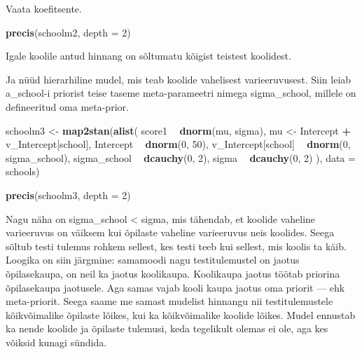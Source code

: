 \documentclass[]{book}
\newenvironment{Shaded}{\begin{snugshade}}{\end{snugshade}}
\newcommand{\KeywordTok}[1]{\textcolor[rgb]{0.13,0.29,0.53}{\textbf{#1}}}
\newcommand{\DataTypeTok}[1]{\textcolor[rgb]{0.13,0.29,0.53}{#1}}
\newcommand{\DecValTok}[1]{\textcolor[rgb]{0.00,0.00,0.81}{#1}}
\newcommand{\StringTok}[1]{\textcolor[rgb]{0.31,0.60,0.02}{#1}}
\newcommand{\OperatorTok}[1]{\textcolor[rgb]{0.81,0.36,0.00}{\textbf{#1}}}
\newcommand{\NormalTok}[1]{#1}
\begin{document}
Vaata koefitsente.

\begin{Shaded}
\begin{Highlighting}[]
\KeywordTok{precis}\NormalTok{(schoolm2, }\DataTypeTok{depth =} \DecValTok{2}\NormalTok{)}
\end{Highlighting}
\end{Shaded}

Igale koolile antud hinnang on sõltumatu kõigist teistest koolidest.

Ja nüüd hierarhiline mudel, mis teab koolide vahelisest varieeruvusest.
Siin leiab a\_school-i priorist teise taseme meta-parameetri nimega
sigma\_school, millele on defineeritud oma meta-prior.

\begin{Shaded}
\begin{Highlighting}[]
\NormalTok{schoolm3 <-}\StringTok{ }\KeywordTok{map2stan}\NormalTok{(}\KeywordTok{alist}\NormalTok{(}
\NormalTok{  score1 }\OperatorTok{~}\StringTok{ }\KeywordTok{dnorm}\NormalTok{(mu, sigma),}
\NormalTok{  mu <-}\StringTok{ }\NormalTok{Intercept }\OperatorTok{+}\StringTok{ }\NormalTok{v_Intercept[school],}
\NormalTok{  Intercept }\OperatorTok{~}\StringTok{ }\KeywordTok{dnorm}\NormalTok{(}\DecValTok{0}\NormalTok{, }\DecValTok{50}\NormalTok{),}
\NormalTok{  v_Intercept[school] }\OperatorTok{~}\StringTok{ }\KeywordTok{dnorm}\NormalTok{(}\DecValTok{0}\NormalTok{, sigma_school),}
\NormalTok{  sigma_school }\OperatorTok{~}\StringTok{ }\KeywordTok{dcauchy}\NormalTok{(}\DecValTok{0}\NormalTok{, }\DecValTok{2}\NormalTok{),}
\NormalTok{  sigma }\OperatorTok{~}\StringTok{ }\KeywordTok{dcauchy}\NormalTok{(}\DecValTok{0}\NormalTok{, }\DecValTok{2}\NormalTok{)}
\NormalTok{), }\DataTypeTok{data =}\NormalTok{ schools)}
\end{Highlighting}
\end{Shaded}

\begin{Shaded}
\begin{Highlighting}[]
\KeywordTok{precis}\NormalTok{(schoolm3, }\DataTypeTok{depth =} \DecValTok{2}\NormalTok{)}
\end{Highlighting}
\end{Shaded}

Nagu näha on sigma\_school \textless{} sigma, mis tähendab, et koolide
vaheline varieeruvus on väiksem kui õpilaste vaheline varieeruvus neis
koolides. Seega sõltub testi tulemus rohkem sellest, kes testi teeb kui
sellest, mis koolis ta käib. Loogika on siin järgmine: samamoodi nagu
testitulemustel on jaotus õpilasekaupa, on neil ka jaotus koolikaupa.
Koolikaupa jaotus töötab priorina õpilasekaupa jaotusele. Aga samas
vajab kooli kaupa jaotus oma priorit --- ehk meta-priorit. Seega saame
me samast mudelist hinnangu nii testitulemustele kõikvõimalike õpilaste
lõikes, kui ka kõikvõimalike koolide lõikes. Mudel ennustab ka nende
koolide ja õpilaste tulemusi, keda tegelikult olemas ei ole, aga kes
võiksid kunagi sündida.
\end{document}
